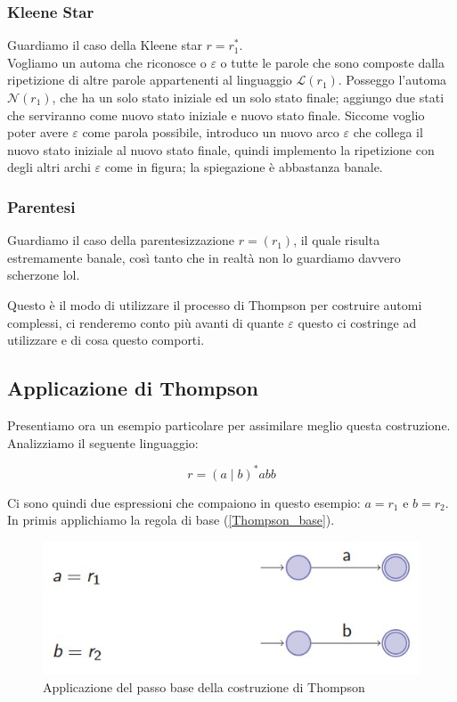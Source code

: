 \documentclass[class=book, crop=false, oneside, 12pt]{standalone}
\begin{document}
\subsubsection{Kleene Star}
Guardiamo il caso della Kleene star \(r = r_1^*\).\\
Vogliamo un automa che riconosce o \(\varepsilon\) o tutte le parole che sono composte dalla ripetizione di altre parole appartenenti al linguaggio \(\mathcal{L}(r_1)\).
Posseggo l’automa \(\mathcal{N}(r_1)\), che ha un solo stato iniziale ed un solo stato finale; aggiungo due stati che serviranno come nuovo stato iniziale e nuovo stato finale.
Siccome voglio poter avere \(\varepsilon\) come parola possibile, introduco un nuovo arco \(\varepsilon\) che collega il nuovo stato iniziale al nuovo stato finale, quindi implemento la ripetizione con degli altri archi \(\varepsilon\) come in figura; la spiegazione è abbastanza banale.

\subsubsection{Parentesi}
Guardiamo il caso della parentesizzazione \(r = ( r_1 )\), il quale risulta estremamente banale, così tanto che in realtà non lo guardiamo davvero scherzone lol.

Questo è il modo di utilizzare il processo di Thompson per costruire automi complessi, ci renderemo conto più avanti di quante \(\varepsilon\) questo ci costringe ad utilizzare e di cosa questo comporti.

\subsection{Applicazione di Thompson}
Presentiamo ora un esempio particolare per assimilare meglio questa costruzione. Analizziamo il seguente linguaggio:

\begin{equation}
    r = (a \mid b)^\ast abb
\end{equation}

\noindent Ci sono quindi due espressioni che compaiono in questo esempio: \(a = r_1\) e \(b = r_2\).
In primis applichiamo la regola di base (\ref{Thompson_base}).

\begin{figure}
    \centering
    \includegraphics[width=.7\textwidth,keepaspectratio]{esempio_Thompson_0}
    \caption{Applicazione del passo base della costruzione di Thompson}
    \label{esempio_Thompson_0}
\end{figure}
\end{document}
